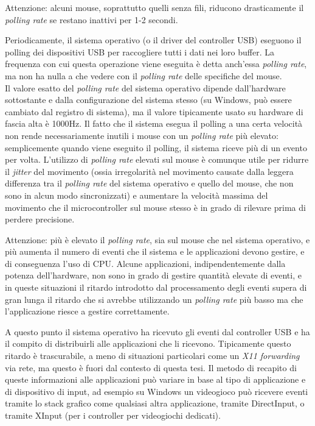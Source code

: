 Attenzione: alcuni mouse, soprattutto quelli senza fili, riducono drasticamente il \textit{polling rate} se restano inattivi per 1-2 secondi.

Periodicamente, il sistema operativo (o il driver del controller USB) eseguono il polling dei dispositivi USB per raccogliere tutti i dati nei loro buffer. La frequenza con cui questa operazione viene eseguita è detta anch'essa \textit{polling rate}, ma non ha nulla a che vedere con il \textit{polling rate} delle specifiche del mouse.\\
Il valore esatto del \textit{polling rate} del sistema operativo dipende dall'hardware sottostante e dalla configurazione del sistema stesso (su Windows, può essere cambiato dal registro di sistema), ma il valore tipicamente usato su hardware di fascia alta è 1000Hz. Il fatto che il sistema esegua il polling a una certa velocità non rende necessariamente inutili i mouse con un \textit{polling rate} più elevato: semplicemente quando viene eseguito il polling, il sistema riceve più di un evento per volta. L'utilizzo di \textit{polling rate} elevati sul mouse è comunque utile per ridurre il \textit{jitter} del movimento (ossia irregolarità nel movimento causate dalla leggera differenza tra il \textit{polling rate} del sistema operativo e quello del mouse, che non sono in alcun modo sincronizzati) e aumentare la velocità massima del movimento che il microcontroller sul mouse stesso è in grado di rilevare prima di perdere precisione.

Attenzione: più è elevato il \textit{polling rate}, sia sul mouse che nel sistema operativo, e più aumenta il numero di eventi che il sistema e le applicazioni devono gestire, e di conseguenza l'uso di CPU. Alcune applicazioni, indipendentemente dalla potenza dell'hardware, non sono in grado di gestire quantità elevate di eventi, e in queste situazioni il ritardo introdotto dal processamento degli eventi supera di gran lunga il ritardo che si avrebbe utilizzando un \textit{polling rate} più basso ma che l'applicazione riesce a gestire correttamente.

A questo punto il sistema operativo ha ricevuto gli eventi dal controller USB e ha il compito di distribuirli alle applicazioni che li ricevono. Tipicamente questo ritardo è trascurabile, a meno di situazioni particolari come un \textit{X11 forwarding} via rete, ma questo è fuori dal contesto di questa tesi. Il metodo di recapito di queste informazioni alle applicazioni può variare in base al tipo di applicazione e di dispositivo di input, ad esempio su Windows un videogioco può ricevere eventi tramite lo stack grafico come qualsiasi altra applicazione, tramite DirectInput, o tramite XInput (per i controller per videogiochi dedicati).

